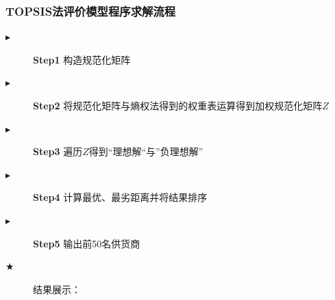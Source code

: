 \documentclass{cumcmthesis}
\begin{document}
\subsubsection*{TOPSIS法评价模型程序求解流程}
\begin{description}
     \item[$\blacktriangleright$] \textbf{Step1} 构造规范化矩阵
     \item[$\blacktriangleright$] \textbf{Step2} 将规范化矩阵与熵权法得到的权重表运算得到加权规范化矩阵$Z$
     \item[$\blacktriangleright$] \textbf{Step3} 遍历$Z$得到“理想解“与”负理想解”
     \item[$\blacktriangleright$] \textbf{Step4} 计算最优、最劣距离并将结果排序
     \item[$\blacktriangleright$] \textbf{Step5} 输出前50名供货商
\end{description}
\newpage
\begin{description}
\item[$\bigstar$] 结果展示：
\end{description}
\end{document}
